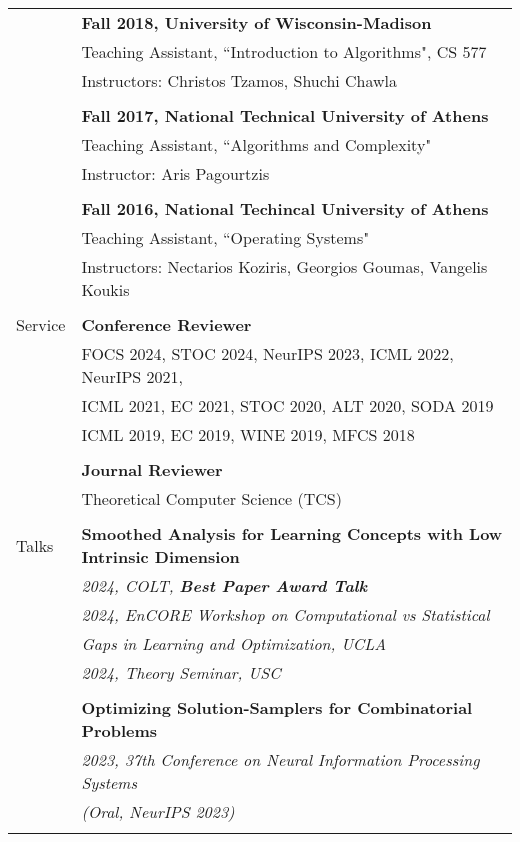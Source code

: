 \documentclass[letterpaper,11pt,oneside]{article}
\begin{document}
\begin{longtable}{@{} l l}
&\textbf{Fall 2018, University of Wisconsin-Madison} \\
& Teaching Assistant, ``Introduction to Algorithms", CS 577 \\
& Instructors: Christos Tzamos, Shuchi Chawla \\
& \\

&\textbf{Fall 2017, National Technical University of Athens} \\
& Teaching Assistant, ``Algorithms and Complexity" \\
& Instructor: Aris Pagourtzis \\
& \\

&\textbf{Fall 2016, National Techincal University of Athens} \\
& Teaching Assistant, ``Operating Systems" \\
& Instructors: Nectarios Koziris, Georgios Goumas, Vangelis Koukis\\
& \\

  \Large{Service} &\textbf{Conference Reviewer}\\

    & FOCS 2024, STOC 2024, NeurIPS 2023, ICML 2022, NeurIPS 2021, \\ 
    & ICML 2021, EC 2021, STOC 2020, ALT 2020, SODA 2019 \\ 
    & ICML 2019, EC 2019, WINE 2019, MFCS 2018 \\
    &\\

    &\textbf{Journal Reviewer}\\
    & Theoretical Computer Science (TCS)\\
    & \\

 \Large{Talks}

 &\textbf{Smoothed Analysis for Learning Concepts with Low Intrinsic Dimension} \\
 & \emph{2024, COLT, \textbf{Best Paper Award Talk}} \\
 &\emph{2024, EnCORE Workshop on Computational vs Statistical} \\
 & \emph{Gaps in Learning and Optimization, UCLA} \\
 & \emph{2024, Theory Seminar, USC} \\
 & \\

 &\textbf{Optimizing Solution-Samplers for Combinatorial Problems}  \\
 &\emph{2023, 37th Conference on Neural Information Processing Systems} \\
 & \emph{(Oral, NeurIPS 2023)} \\
 & \\


\end{longtable}
\end{document}
